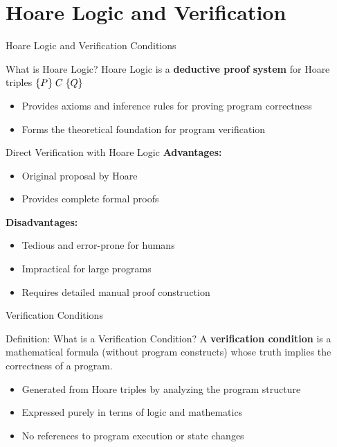 \section{Hoare Logic and Verification}

\begin{frame}{Hoare Logic and Verification Conditions}
    \begin{block}{What is Hoare Logic?}
        Hoare Logic is a \textbf{deductive proof system} for Hoare triples $\{P\}\; C\; \{Q\}$
        \begin{itemize}
            \item Provides axioms and inference rules for proving program correctness
            \item Forms the theoretical foundation for program verification
        \end{itemize}
    \end{block}
    
    \begin{block}{Direct Verification with Hoare Logic}
        \textbf{Advantages:}
        \begin{itemize}
            \item Original proposal by Hoare
            \item Provides complete formal proofs
        \end{itemize}
        
        \textbf{Disadvantages:}
        \begin{itemize}
            \item Tedious and error-prone for humans
            \item Impractical for large programs
            \item Requires detailed manual proof construction
        \end{itemize}
    \end{block}
\end{frame}

\begin{frame}{Verification Conditions}
    \begin{block}{Definition: What is a Verification Condition?}
        A \textbf{verification condition} is a mathematical formula (without program constructs) whose truth implies the correctness of a program.
        \begin{itemize}
            \item Generated from Hoare triples by analyzing the program structure
            \item Expressed purely in terms of logic and mathematics
            \item No references to program execution or state changes
        \end{itemize}
    \end{block}
\end{frame}

